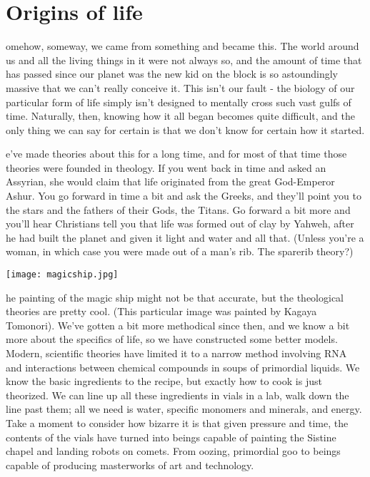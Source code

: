 \section{Origins of life}

omehow, someway, we came from something and became this. The world around us and all the living things in it were not always so, and the amount of time that has passed since our planet was the new kid on the block is so astoundingly massive that we can’t really conceive it. This isn’t our fault - the biology of our particular form of life simply isn’t designed to mentally cross such vast gulfs of time. Naturally, then, knowing how it all began becomes quite difficult, and the only thing we can say for certain is that we don’t know for certain how it started.

e’ve made theories about this for a long time, and for most of that time those theories were founded in theology. If you went back in time and asked an Assyrian, she would claim that life originated from the great God-Emperor Ashur. You go forward in time a bit and ask the Greeks, and they’ll point you to the stars and the fathers of their Gods, the Titans. Go forward a bit more and you’ll hear Christians tell you that life was formed out of clay by Yahweh, after he had built the planet and given it light and water and all that. (Unless you’re a woman, in which case you were made out of a man’s rib. The sparerib theory?) 

\begin{center}
	\texttt{[image: magicship.jpg]}
\end{center}

he painting of the magic ship might not be that accurate, but the theological theories are pretty cool. (This particular image was painted by Kagaya Tomonori). We’ve gotten a bit more methodical since then, and we know a bit more about the specifics of life, so we have constructed some better models. Modern, scientific theories have limited it to a narrow method involving RNA and interactions between chemical compounds in soups of primordial liquids. We know the basic ingredients to the recipe, but exactly how to cook is just theorized. We can line up all these ingredients in vials in a lab, walk down the line past them; all we need is water, specific monomers and minerals, and energy. Take a moment to consider how bizarre it is that given pressure and time, the contents of the vials have turned into beings capable of painting the Sistine chapel and landing robots on comets. From oozing, primordial goo to beings capable of producing masterworks of art and technology.

